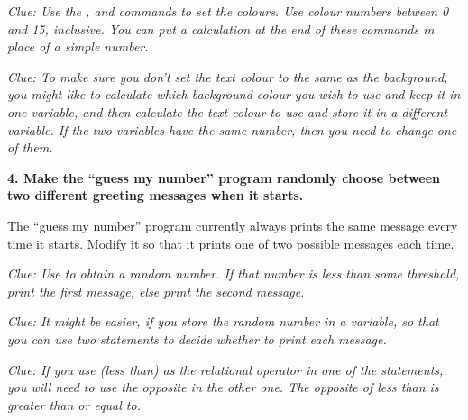 {\em Clue: Use the ,  and 
  commands to set the colours. Use colour numbers between 0 and 15,
  inclusive.
  You can put a calculation at the end of
  these commands in place of a simple number.}

{\em Clue: To make sure you don't set the text colour to the same as
  the background, you might like to calculate which background colour
  you wish to use and keep it in one variable, and then calculate the
  text colour to use and store it in a different variable. If the two
  variables have the same number, then you need to change one of
  them.}

{\bf 4. Make the ``guess my number'' program randomly choose between
  two different greeting messages when it starts.}

The ``guess my number'' program currently always prints the same
message every time it starts.  Modify it so that it prints one of two
possible messages each time.

{\em Clue: Use  to obtain a random number. If that number
  is less than some threshold, print the first message, else print the
  second message.}

{\em Clue: It might be easier, if you store the random number in a
  variable, so that you can use two  statements to decide
  whether to print each message.}

{\em Clue: If you use \stw{<} (less than) as the relational operator
  in one of the  statements, you will need to use the opposite
  in the other one.  The opposite of less than is greater than or
  equal to.}

